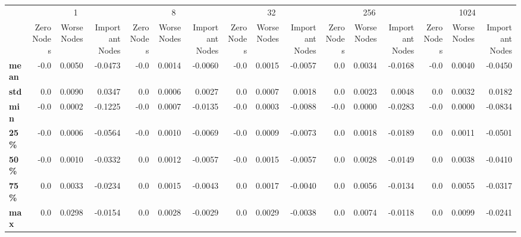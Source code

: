 \begin{tabular}{lrrrrrrrrrrrrrrr}
\toprule
{} & \multicolumn{3}{c}{1} & \multicolumn{3}{c}{8} & \multicolumn{3}{c}{32} & \multicolumn{3}{c}{256} & \multicolumn{3}{c}{1024} \\
{} & Zero Nodes & Worse Nodes & Important Nodes & Zero Nodes & Worse Nodes & Important Nodes & Zero Nodes & Worse Nodes & Important Nodes & Zero Nodes & Worse Nodes & Important Nodes & Zero Nodes & Worse Nodes & Important Nodes \\
\midrule
\textbf{mean} &       -0.0 &      0.0050 &         -0.0473 &       -0.0 &      0.0014 &         -0.0060 &       -0.0 &      0.0015 &         -0.0057 &        0.0 &      0.0034 &         -0.0168 &       -0.0 &      0.0040 &         -0.0450 \\
\textbf{std } &        0.0 &      0.0090 &          0.0347 &        0.0 &      0.0006 &          0.0027 &        0.0 &      0.0007 &          0.0018 &        0.0 &      0.0023 &          0.0048 &        0.0 &      0.0032 &          0.0182 \\
\textbf{min } &       -0.0 &      0.0002 &         -0.1225 &       -0.0 &      0.0007 &         -0.0135 &       -0.0 &      0.0003 &         -0.0088 &       -0.0 &      0.0000 &         -0.0283 &       -0.0 &      0.0000 &         -0.0834 \\
\textbf{25\% } &       -0.0 &      0.0006 &         -0.0564 &       -0.0 &      0.0010 &         -0.0069 &       -0.0 &      0.0009 &         -0.0073 &        0.0 &      0.0018 &         -0.0189 &        0.0 &      0.0011 &         -0.0501 \\
\textbf{50\% } &       -0.0 &      0.0010 &         -0.0332 &        0.0 &      0.0012 &         -0.0057 &       -0.0 &      0.0015 &         -0.0057 &        0.0 &      0.0028 &         -0.0149 &        0.0 &      0.0038 &         -0.0410 \\
\textbf{75\% } &        0.0 &      0.0033 &         -0.0234 &        0.0 &      0.0015 &         -0.0043 &        0.0 &      0.0017 &         -0.0040 &        0.0 &      0.0056 &         -0.0134 &        0.0 &      0.0055 &         -0.0317 \\
\textbf{max } &        0.0 &      0.0298 &         -0.0154 &        0.0 &      0.0028 &         -0.0029 &        0.0 &      0.0029 &         -0.0038 &        0.0 &      0.0074 &         -0.0118 &        0.0 &      0.0099 &         -0.0241 \\
\bottomrule
\end{tabular}
